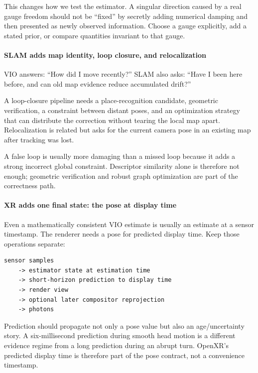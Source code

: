 This changes how we test the estimator. A singular direction caused by a real gauge freedom should not be ``fixed'' by secretly adding numerical damping and then presented as newly observed information. Choose a gauge explicitly, add a stated prior, or compare quantities invariant to that gauge.

\paragraph{SLAM adds map identity, loop closure, and relocalization}\label{04-visual-computing-ii-ch035-slam-adds-map-identity-loop-closure-and-relocalization}

VIO answers: ``How did I move recently?'' SLAM also asks: ``Have I been here before, and can old map evidence reduce accumulated drift?''

A loop-closure pipeline needs a place-recognition candidate, geometric verification, a constraint between distant poses, and an optimization strategy that can distribute the correction without tearing the local map apart. Relocalization is related but asks for the current camera pose in an existing map after tracking was lost.

A false loop is usually more damaging than a missed loop because it adds a strong incorrect global constraint. Descriptor similarity alone is therefore not enough; geometric verification and robust graph optimization are part of the correctness path.

\paragraph{XR adds one final state: the pose at display time}\label{04-visual-computing-ii-ch035-xr-adds-one-final-state-the-pose-at-display-time}

Even a mathematically consistent VIO estimate is usually an estimate at a sensor timestamp. The renderer needs a pose for predicted display time. Keep those operations separate:

\begin{verbatim}
sensor samples
    -> estimator state at estimation time
    -> short-horizon prediction to display time
    -> render view
    -> optional later compositor reprojection
    -> photons
\end{verbatim}

Prediction should propagate not only a pose value but also an age/uncertainty story. A six-millisecond prediction during smooth head motion is a different evidence regime from a long prediction during an abrupt turn. OpenXR's predicted display time is therefore part of the pose contract, not a convenience timestamp.

